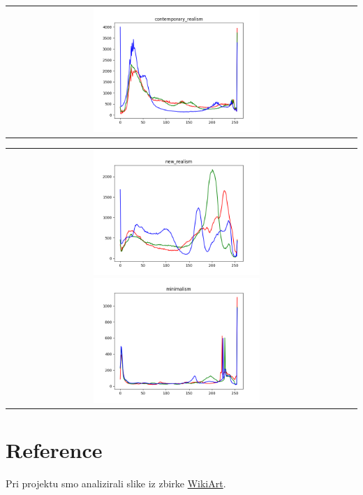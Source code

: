 \documentclass{article}
\begin{document}
\begin{center}
\begin{tabular}{cc}
				\includegraphics[width=0.5\textwidth]{plots/contemporary_realism.png}\par

			\end{tabular}
		\end{center}
		\newpage

		\begin{center}
			\begin{tabular}{cc}

				\noindent
				\includegraphics[width=0.5\textwidth]{plots/new_realism.png}
				\includegraphics[width=0.5\textwidth]{plots/minimalism.png}\par

			\end{tabular}
		\end{center}
		\newpage


	\section{Reference}
		Pri projektu smo analizirali slike iz zbirke \href{https://www.wikiart.org/}{WikiArt}.
\end{document}
